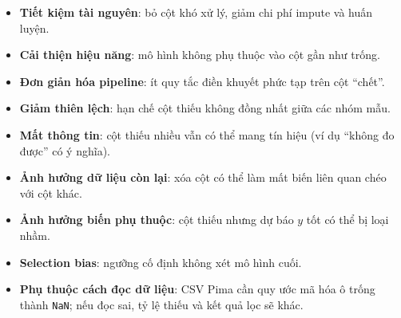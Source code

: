 \begin{tinhchat}[title={Ưu điểm}]
\begin{itemize}
  \item \textbf{Tiết kiệm tài nguyên}: bỏ cột khó xử lý, giảm chi phí impute và huấn luyện.
  \item \textbf{Cải thiện hiệu năng}: mô hình không phụ thuộc vào cột gần như trống.
  \item \textbf{Đơn giản hóa pipeline}: ít quy tắc điền khuyết phức tạp trên cột ``chết''.
  \item \textbf{Giảm thiên lệch}: hạn chế cột thiếu không đồng nhất giữa các nhóm mẫu.
\end{itemize}
\end{tinhchat}

\begin{luuy}[title={Nhược điểm}]
\begin{itemize}
  \item \textbf{Mất thông tin}: cột thiếu nhiều vẫn có thể mang tín hiệu (ví dụ ``không đo được'' có ý nghĩa).
  \item \textbf{Ảnh hưởng dữ liệu còn lại}: xóa cột có thể làm mất biến liên quan chéo với cột khác.
  \item \textbf{Ảnh hưởng biến phụ thuộc}: cột thiếu nhưng dự báo $y$ tốt có thể bị loại nhầm.
  \item \textbf{Selection bias}: ngưỡng cố định không xét mô hình cuối.
  \item \textbf{Phụ thuộc cách đọc dữ liệu}: CSV Pima cần quy ước mã hóa ô trống thành \texttt{NaN}; nếu đọc sai, tỷ lệ thiếu và kết quả lọc sẽ khác.
\end{itemize}
\end{luuy}
